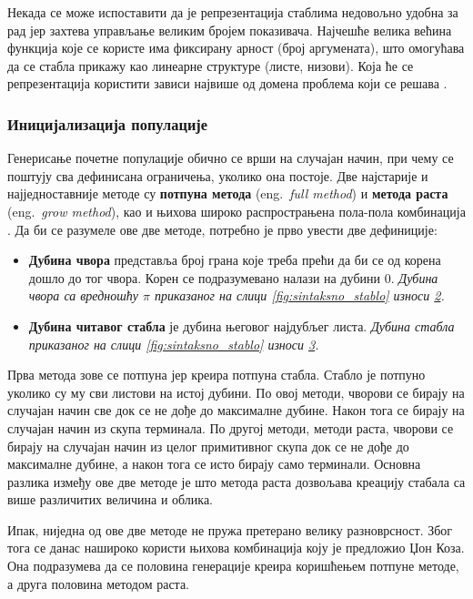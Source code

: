 \documentclass[a4paper]{article}
\begin{document}
Некада се може испоставити да је репрезентација стаблима недовољно удобна за рад јер захтева управљање великим бројем показивача. Најчешће велика већина функција које се користе има фиксирану арност (број аргумената), што омогућава да се стабла прикажу као линеарне структуре (листе, низови). Која ће се репрезентација користити зависи највише од домена проблема који се решава \cite{fieldGuidetoGP}.

\subsubsection{Иницијализација популације}

Генерисање почетне популације обично се врши на случајан начин, при чему се поштују сва дефинисана ограничења, уколико она постоје. Две најстарије и најједноставније методе су \textbf{потпуна метода} (eng.~{\em full method}) и \textbf{метода раста} (eng.~{\em grow method}), као и њихова широко распрострањена пола-пола комбинација \cite{fieldGuidetoGP}. Да би се разумеле ове две методе, потребно је прво увести две дефиниције:

\begin{itemize}
    \item \textbf{Дубина чвора} представља број грана које треба прећи да би се од корена дошло до тог чвора. Корен се подразумевано налази на дубини 0.\newline
    \emph{Дубина чвора са вредношћу $\pi$ приказаног на слици \ref{fig:sintaksno_stablo} износи \underline{2}.}
    \item \textbf{Дубина читавог стабла} је дубина његовог најдубљег листа.
    \emph{Дубина стабла приказаног на слици \ref{fig:sintaksno_stablo} износи \underline{3}.}
\end{itemize}

Прва метода зове се потпуна јер креира потпуна стабла. Стабло је потпуно уколико су му сви листови на истој дубини. По овој методи, чворови се бирају на случајан начин све док се не дође до максималне дубине. Након тога се бирају на случајан начин из скупа терминала. По другој методи, методи раста, чворови се бирају на случајан начин из целог примитивног скупа док се не дође до максималне дубине, а након тога се исто бирају само терминали. Основна разлика између ове две методе је што метода раста дозвољава креацију стабала са више различитих величина и облика.\newline

Ипак, ниједна од ове две методе не пружа претерано велику разноврсност. Због тога се данас нашироко користи њихова комбинација коју је предложио Џон Коза. Она подразумева да се половина генерације креира коришћењем потпуне методе, а друга половина методом раста.
\end{document}
